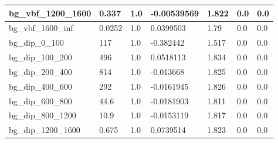 \documentclass[a4paper, 10pt]{article}
\begin{document}
\begin{table}[H]
\begin{center}
\begin{tabular}{|m{23.0mm}|m{23.0mm}|m{18.0mm}|m{19.0mm}|m{19.0mm}|m{19.0mm}|m{19.0mm}|}
      \hline
      {\cellcolor{white}         bg\_vbf\_1200\_1600}& {\cellcolor{white}         0.337}& {\cellcolor{white}         1.0}& {\cellcolor{white}         -0.00539569}& {\cellcolor{white}         1.822}& {\cellcolor{green}         0.0}& {\cellcolor{green}         0.0}\\
      \hline
      {\cellcolor{white}         bg\_vbf\_1600\_inf}& {\cellcolor{white}         0.0252}& {\cellcolor{white}         1.0}& {\cellcolor{white}         0.0399503}& {\cellcolor{white}         1.79}& {\cellcolor{green}         0.0}& {\cellcolor{green}         0.0}\\
      \hline
      {\cellcolor{white}         bg\_dip\_0\_100}& {\cellcolor{white}         117}& {\cellcolor{white}         1.0}& {\cellcolor{white}         -0.382442}& {\cellcolor{white}         1.517}& {\cellcolor{green}         0.0}& {\cellcolor{green}         0.0}\\
      \hline
      {\cellcolor{white}         bg\_dip\_100\_200}& {\cellcolor{white}         496}& {\cellcolor{white}         1.0}& {\cellcolor{white}         0.0518113}& {\cellcolor{white}         1.834}& {\cellcolor{green}         0.0}& {\cellcolor{green}         0.0}\\
      \hline
      {\cellcolor{white}         bg\_dip\_200\_400}& {\cellcolor{white}         814}& {\cellcolor{white}         1.0}& {\cellcolor{white}         -0.013668}& {\cellcolor{white}         1.825}& {\cellcolor{green}         0.0}& {\cellcolor{green}         0.0}\\
      \hline
      {\cellcolor{white}         bg\_dip\_400\_600}& {\cellcolor{white}         292}& {\cellcolor{white}         1.0}& {\cellcolor{white}         -0.0161945}& {\cellcolor{white}         1.826}& {\cellcolor{green}         0.0}& {\cellcolor{green}         0.0}\\
      \hline
      {\cellcolor{white}         bg\_dip\_600\_800}& {\cellcolor{white}         44.6}& {\cellcolor{white}         1.0}& {\cellcolor{white}         -0.0181903}& {\cellcolor{white}         1.811}& {\cellcolor{green}         0.0}& {\cellcolor{green}         0.0}\\
      \hline
      {\cellcolor{white}         bg\_dip\_800\_1200}& {\cellcolor{white}         10.9}& {\cellcolor{white}         1.0}& {\cellcolor{white}         -0.0153119}& {\cellcolor{white}         1.817}& {\cellcolor{green}         0.0}& {\cellcolor{green}         0.0}\\
      \hline
      {\cellcolor{white}         bg\_dip\_1200\_1600}& {\cellcolor{white}         0.675}& {\cellcolor{white}         1.0}& {\cellcolor{white}         0.0739514}& {\cellcolor{white}         1.823}& {\cellcolor{green}         0.0}& {\cellcolor{green}         0.0}\\

\end{tabular}
\end{center}
\end{table}
\end{document}
